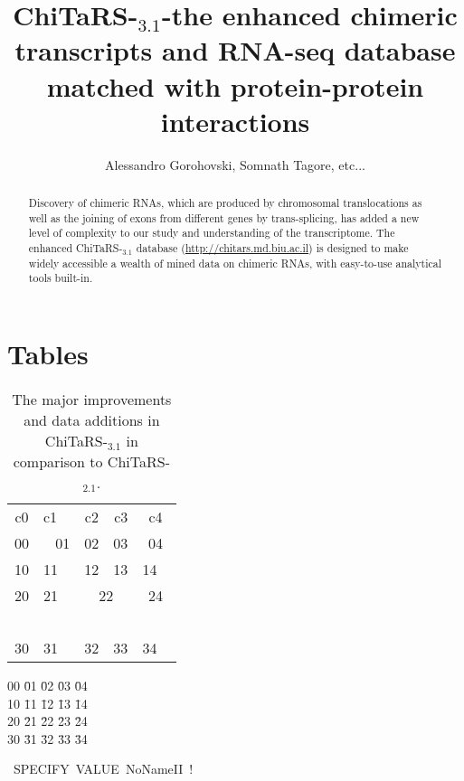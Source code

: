 \documentclass[10pt,a4paper]{article}
\title{
ChiTaRS-${}_{3.1}$-the enhanced chimeric transcripts and RNA-seq database matched with protein-protein interactions
}
\author{Alessandro Gorohovski, Somnath Tagore, etc...
}
\begin{document}
\maketitle

\begin{abstract}
Discovery of chimeric RNAs, which are produced by chromosomal translocations as well as 
the joining of exons from different genes by trans-splicing, has added a new level of complexity to our study and 
understanding of the transcriptome. The enhanced ChiTaRS-${}_{3.1}$ database (\url{http://chitars.md.biu.ac.il}) is designed 
to make widely accessible a wealth of mined data on chimeric RNAs, with easy-to-use analytical tools built-in.
\end{abstract}

\section{Tables}

\begin{table}[!ht]
  \caption{The major improvements and data additions in ChiTaRS-${}_{3.1}$ in comparison to ChiTaRS-${}_{2.1}$.
}
  \tabcolsep=2mm 
  \centering
  \begin{tabular}[t]{clcrc}
c0 & c1 & c2 & c3 & c4 \\
\rule{0mm}{1.5em}
00
 &
~
01
 &
02
 &
\color{green}
\scriptsize
03
 &
04
\\
\hline
\rule{0mm}{1.5em}
10
 &
11
 &
12
 &
13
 &
14
~
\\
\hline
\hline
\color{green}
\footnotesize\color{blue}
\rule{0mm}{1.5em}
20
 &
21
 &
\multicolumn{2}{c}{
22
}
 &
24
\\ \cline{3-4}
~
\\
\hline
\large\color{red}
\rule{0mm}{1.5em}
30
 &
31
 &
32
 &
33
 &
34
~
\\
\hline
  \end{tabular}
\end{table}

\begin{center}

\begin{tabbing}
00
 \=
01
 \=
02
 \=
03
 \=
04
\\
10
 \=
11
 \=
12
 \=
13
 \=
14
\\
20
 \=
21
 \=
22
 \=
23
 \=
24
\\
30
 \=
31
 \=
32
 \=
33
 \=
34
\end{tabbing}

\end{center}


\mbox{
SPECIFY VALUE NoNameII !
}
\end{document}
